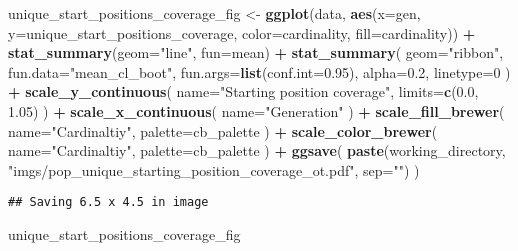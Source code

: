 \documentclass[]{book}
\newenvironment{Shaded}{\begin{snugshade}}{\end{snugshade}}
\newcommand{\DataTypeTok}[1]{\textcolor[rgb]{0.13,0.29,0.53}{#1}}
\newcommand{\DecValTok}[1]{\textcolor[rgb]{0.00,0.00,0.81}{#1}}
\newcommand{\FloatTok}[1]{\textcolor[rgb]{0.00,0.00,0.81}{#1}}
\newcommand{\KeywordTok}[1]{\textcolor[rgb]{0.13,0.29,0.53}{\textbf{#1}}}
\newcommand{\NormalTok}[1]{#1}
\newcommand{\OperatorTok}[1]{\textcolor[rgb]{0.81,0.36,0.00}{\textbf{#1}}}
\newcommand{\StringTok}[1]{\textcolor[rgb]{0.31,0.60,0.02}{#1}}
\begin{document}
\begin{Shaded}
\begin{Highlighting}[]
\NormalTok{unique_start_positions_coverage_fig <-}\StringTok{ }\KeywordTok{ggplot}\NormalTok{(data, }\KeywordTok{aes}\NormalTok{(}\DataTypeTok{x=}\NormalTok{gen, }\DataTypeTok{y=}\NormalTok{unique_start_positions_coverage, }\DataTypeTok{color=}\NormalTok{cardinality, }\DataTypeTok{fill=}\NormalTok{cardinality)) }\OperatorTok{+}
\StringTok{  }\KeywordTok{stat_summary}\NormalTok{(}\DataTypeTok{geom=}\StringTok{"line"}\NormalTok{, }\DataTypeTok{fun=}\NormalTok{mean) }\OperatorTok{+}
\StringTok{  }\KeywordTok{stat_summary}\NormalTok{(}
    \DataTypeTok{geom=}\StringTok{"ribbon"}\NormalTok{,}
    \DataTypeTok{fun.data=}\StringTok{"mean_cl_boot"}\NormalTok{,}
    \DataTypeTok{fun.args=}\KeywordTok{list}\NormalTok{(}\DataTypeTok{conf.int=}\FloatTok{0.95}\NormalTok{),}
    \DataTypeTok{alpha=}\FloatTok{0.2}\NormalTok{,}
    \DataTypeTok{linetype=}\DecValTok{0}
\NormalTok{  ) }\OperatorTok{+}
\StringTok{  }\KeywordTok{scale_y_continuous}\NormalTok{(}
    \DataTypeTok{name=}\StringTok{"Starting position coverage"}\NormalTok{,}
    \DataTypeTok{limits=}\KeywordTok{c}\NormalTok{(}\FloatTok{0.0}\NormalTok{, }\FloatTok{1.05}\NormalTok{)}
\NormalTok{  ) }\OperatorTok{+}
\StringTok{  }\KeywordTok{scale_x_continuous}\NormalTok{(}
    \DataTypeTok{name=}\StringTok{"Generation"}
\NormalTok{  ) }\OperatorTok{+}
\StringTok{  }\KeywordTok{scale_fill_brewer}\NormalTok{(}
    \DataTypeTok{name=}\StringTok{"Cardinaltiy"}\NormalTok{,}
    \DataTypeTok{palette=}\NormalTok{cb_palette}
\NormalTok{  ) }\OperatorTok{+}
\StringTok{  }\KeywordTok{scale_color_brewer}\NormalTok{(}
    \DataTypeTok{name=}\StringTok{"Cardinaltiy"}\NormalTok{,}
    \DataTypeTok{palette=}\NormalTok{cb_palette}
\NormalTok{  ) }\OperatorTok{+}
\StringTok{  }\KeywordTok{ggsave}\NormalTok{(}
    \KeywordTok{paste}\NormalTok{(working_directory, }\StringTok{"imgs/pop_unique_starting_position_coverage_ot.pdf"}\NormalTok{, }\DataTypeTok{sep=}\StringTok{""}\NormalTok{)}
\NormalTok{  )}
\end{Highlighting}
\end{Shaded}

\begin{verbatim}
## Saving 6.5 x 4.5 in image
\end{verbatim}

\begin{Shaded}
\begin{Highlighting}[]
\NormalTok{unique_start_positions_coverage_fig}
\end{Highlighting}
\end{Shaded}
\end{document}
